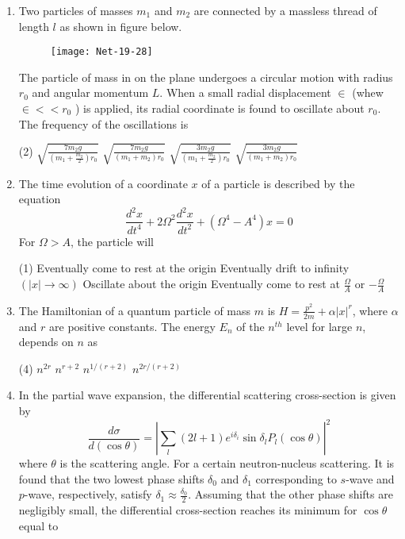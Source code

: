 \begin{enumerate}
\item Two particles of masses $m_{1}$ and $m_{2}$ are connected by a massless thread of length $l$ as shown in figure below.
\begin{figure}[H]
	\centering
	\texttt{[image: Net-19-28]}
\end{figure}
The particle of mass in on the plane undergoes a circular motion with radius $r_{0}$ and angular momentum $L$. When a small radial displacement $\in$ (whew $\in<<r_{0}$ ) is applied, its radial coordinate is found to oscillate about $r_{0}$. The frequency of the oscillations is
 \begin{tasks}(2)
	\task[\textbf{a.}] $\sqrt{\frac{7 m_{2} g}{\left(m_{1}+\frac{m_{2}}{2}\right) r_{0}}}$
	\task[\textbf{b.}]$\sqrt{\frac{7 m_{2} g}{\left(m_{1}+m_{2}\right) r_{0}}}$
	\task[\textbf{c.}]$\sqrt{\frac{3 m_{2} g}{\left(m_{1}+\frac{m_{2}}{2}\right) r_{0}}}$
	\task[\textbf{d.}] $\sqrt{\frac{3 m_{2} g}{\left(m_{1}+m_{2}\right) r_{0}}}$
\end{tasks}
\item  The time evolution of a coordinate $x$ of a particle is described by the equation
$$
\frac{d^{2} x}{d t^{4}}+2 \Omega^{2} \frac{d^{2} x}{d t^{2}}+\left(\Omega^{4}-A^{4}\right) x=0
$$
For $\Omega>A$, the particle will
 \begin{tasks}(1)
	\task[\textbf{a.}]Eventually come to rest at the origin
	\task[\textbf{b.}] Eventually drift to infinity $(|x| \rightarrow \infty)$
	\task[\textbf{c.}] Oscillate about the origin
	\task[\textbf{d.}] Eventually come to rest at $\frac{\Omega}{A}$ or $-\frac{\Omega}{A}$
\end{tasks}
\item  The Hamiltonian of a quantum particle of mass $m$ is $H=\frac{p^{2}}{2 m}+\alpha|x|^{r}$, where $\alpha$ and $r$ are positive constants. The energy $E_{n}$ of the $n^{t h}$ level for large $n$, depends on $n$ as
 \begin{tasks}(4)
	\task[\textbf{a.}]$n^{2 r}$
	\task[\textbf{b.}]$n^{r+2}$
	\task[\textbf{c.}]$n^{1 /(r+2)}$
	\task[\textbf{d.}] $n^{2 r /(r+2)}$
\end{tasks}
\item In the partial wave expansion, the differential scattering cross-section is given by
$$
\frac{d \sigma}{d(\cos \theta)}=\left|\sum_{l}(2 l+1) e^{i \delta_{i}} \sin \delta_{l} P_{l}(\cos \theta)\right|^{2}
$$
where $\theta$ is the scattering angle. For a certain neutron-nucleus scattering. It is found that the two lowest phase shifts $\delta_{0}$ and $\delta_{1}$ corresponding to $s$-wave and $p$-wave, respectively, satisfy $\delta_{1} \approx \frac{\delta_{0}}{2}$. Assuming that the other phase shifts are negligibly small, the differential cross-section reaches its minimum for $\cos \theta$ equal to

\end{enumerate}
